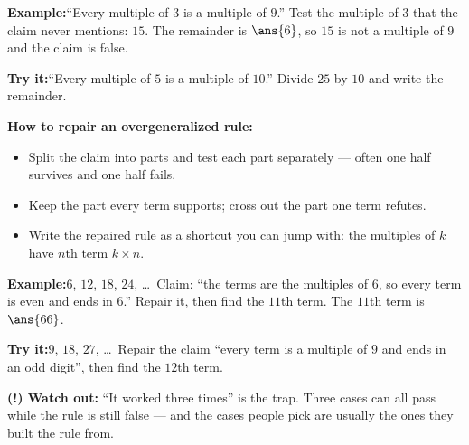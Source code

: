 \documentclass[12pt]{article}
\begin{document}
\begin{examplebox}
\textbf{Example:}\quad ``Every multiple of $3$ is a multiple of $9$.'' Test the
multiple of $3$ that the claim never mentions: $15$.
The remainder is $\ans{6}$, so $15$ is not a multiple of $9$ and the claim is false.
\end{examplebox}

\begin{tryitbox}
\textbf{Try it:}\quad ``Every multiple of $5$ is a multiple of $10$.'' Divide $25$
by $10$ and write the remainder.\\[2pt]
\end{tryitbox}


\begin{formulabox}
\textbf{How to repair an overgeneralized rule:}
\begin{itemize}[leftmargin=0.8cm, itemsep=1pt, topsep=2pt]
  \item Split the claim into parts and test each part separately --- often one half
        survives and one half fails.
  \item Keep the part every term supports; cross out the part one term refutes.
  \item Write the repaired rule as a shortcut you can jump with:
        the multiples of $k$ have $n$th term $k \times n$.
\end{itemize}
\end{formulabox}

\begin{examplebox}
\textbf{Example:}\quad $6$, $12$, $18$, $24$, \ldots\ Claim: ``the terms are the
multiples of $6$, so every term is even and ends in $6$.'' Repair it, then find the
$11$th term.
The $11$th term is $\ans{66}$.
\end{examplebox}

\begin{tryitbox}
\textbf{Try it:}\quad $9$, $18$, $27$, \ldots\ Repair the claim ``every term is a
multiple of $9$ and ends in an odd digit'', then find the $12$th term.\\[2pt]
\end{tryitbox}

\begin{watchoutbox}
\textbf{(!) Watch out:} ``It worked three times'' is the trap. Three cases can all
pass while the rule is still false --- and the cases people pick are usually the
ones they built the rule from.
\end{watchoutbox}
\end{document}
